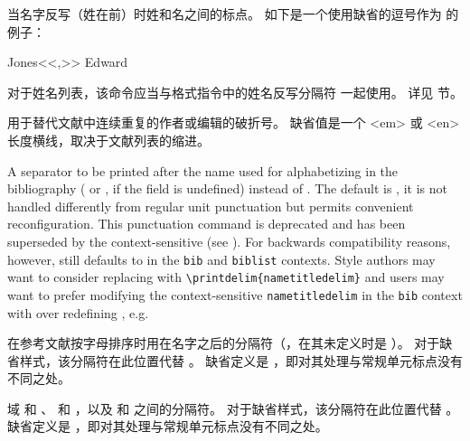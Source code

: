 \begin{ltxsyntax}
当名字反写（姓在前）时姓和名之间的标点。
如下是一个使用缺省的逗号作为  的例子：

\begin{ltxexample}
Jones<<,>> Edward
\end{ltxexample}

对于姓名列表，该命令应当与格式指令中的姓名反写分隔符  一起使用。
详见  节。

用于替代文献中连续重复的作者或编辑的破折号。
缺省值是一个 <em> 或 <en> 长度横线，取决于文献列表的缩进。

\DeprecatedMark
A separator to be printed after the name used for alphabetizing in the bibliography ( or , if the  field is undefined) instead of . The default is , \ie it is not handled differently from regular unit punctuation but permits convenient reconfiguration. This punctuation command is deprecated and has been superseded by the context-sensitive  (see ). For backwards compatibility reasons, however,  still defaults to  in the \texttt{bib} and \texttt{biblist} contexts. Style authors may want to consider replacing  with \texttt{\textbackslash printdelim\{nametitledelim\}} and users may want to prefer modifying the context-sensitive \texttt{nametitledelim} in the \texttt{bib} context with  over redefining , e.g.
\begin{ltxexample}
\end{ltxexample}

在参考文献按字母排序时用在名字之后的分隔符（，在其未定义时是 ）。
对于缺省样式，该分隔符在此位置代替 。
缺省定义是 ，即对其处理与常规单元标点没有不同之处。

域  和 、 和 ，以及  和  之间的分隔符。
对于缺省样式，该分隔符在此位置代替 。
缺省定义是 ，即对其处理与常规单元标点没有不同之处。


\end{ltxsyntax}
